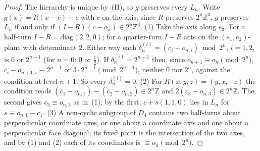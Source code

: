 \documentclass[11pt]{article}
\theoremstyle{definition}
\theoremstyle{remark}
\begin{document}
\begin{proof}
The hierarchy is unique by~(H), so $g$ preserves every $L_{n}$.  Write $g(x)=R(x-c)+c$ with $c$ on the
axis; since $R$ preserves $2^{n}\mathbb{Z}^{3}$, $g$ preserves $L_{n}$ if and only if $(I-R)(c-o_{n})\in2^{n}\mathbb{Z}^{3}$.
(1) Take the axis along $e_{3}$.  For a half-turn $I-R=\mathrm{diag}(2,2,0)$; for a quarter-turn $I-R$ acts on the
$(e_{1},e_{2})$-plane with determinant $2$.  Either way each $\delta^{(i)}_{n}=(c_{i}-o_{n,i})\bmod2^{n}$, $i=1,2$, is $0$ or
$2^{n-1}$ (for $n=0$: $0$ or $\tfrac12$).  If $\delta^{(i)}_{n}=2^{n-1}$ then, since $o_{n+1}\equiv o_{n}\pmod{2^{n}}$,
$c_{i}-o_{n+1,i}\equiv2^{n-1}$ or $3\cdot2^{n-1}\pmod{2^{n+1}}$, neither $0$ nor $2^{n}$, against the condition at level
$n+1$.  So every $\delta^{(i)}_{n}=0$.
(2) For $R(x,y,z)=(y,x,-z)$ the condition reads $(c_{1}-o_{n,1})-(c_{2}-o_{n,2})\in2^{n}\mathbb{Z}$ and
$2(c_{3}-o_{n,3})\in2^{n}\mathbb{Z}$.  The second gives $c_{3}\equiv o_{n,3}$ as in~(1); by the first, $c+s(1,1,0)$ lies in
$L_{n}$ for $s\equiv o_{n,1}-c_{1}$.
(3) A non-cyclic subgroup of $D_{4}$ contains two half-turns about perpendicular coordinate axes, or one about a coordinate
axis and one about a perpendicular face diagonal; its fixed point is the intersection of the two axes, and by (1) and (2)
each of its coordinates is $\equiv o_{n}\pmod{2^{n}}$.
\end{proof}
\end{document}
